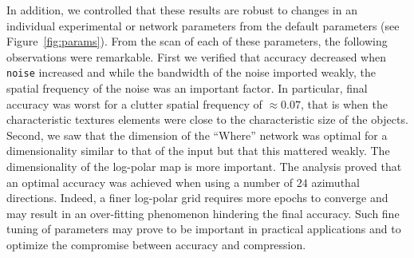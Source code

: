 In addition, we controlled that these results are robust to changes in an individual experimental or network parameters from the default parameters (see Figure~\ref{fig:params}). From the scan of each of these parameters, the following observations were remarkable. First we verified that accuracy decreased when \texttt{noise} increased and while the bandwidth of the noise imported weakly, the spatial frequency of the noise was an important factor. In particular, final accuracy was worst for a clutter spatial frequency of $\approx 0.07$, that is when the characteristic textures elements were close to the characteristic size of the objects. Second, we saw that the dimension of the ``Where'' network was optimal for a dimensionality similar to that of the input but that this mattered weakly. The dimensionality of the log-polar map is more important. The analysis proved that an optimal accuracy was achieved when using a number of $24$ azimuthal directions. Indeed, a finer log-polar grid requires more epochs to converge and may result in an over-fitting phenomenon hindering the final accuracy. Such fine tuning of parameters may prove to be important in practical applications and to optimize the compromise between accuracy and compression.
